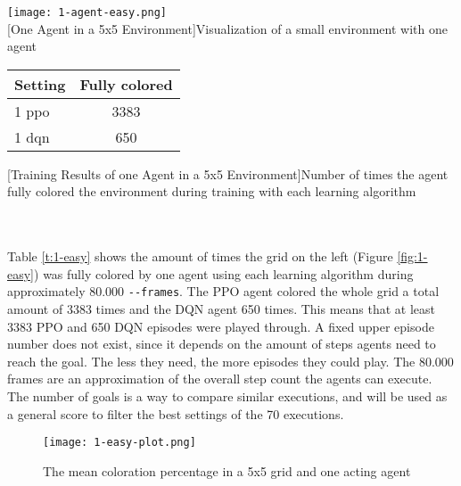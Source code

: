 \begin{minipage}{\textwidth}
  \begin{minipage}[b]{0.29\textwidth}
    \centering
    \texttt{[image: 1-agent-easy.png]}\\
    [One Agent in a 5x5 Environment]{Visualization of a small environment with one agent}\label{fig:1-easy}
  \end{minipage}
  \hfill
  \begin{minipage}[b]{0.69\textwidth}
    \centering
    \begin{tabular}{lc}\hline
      Setting & Fully colored \\ \hline
        1 ppo & 3383 \\
        1 dqn & 650 \\ \hline
      \end{tabular}
      [Training Results of one Agent in a 5x5 Environment]{Number of times the agent fully colored the environment during training with each learning algorithm \\}\label{t:1-easy}
    \end{minipage}
  \end{minipage}\\\\

Table \ref{t:1-easy} shows the amount of times the grid on the left (Figure \ref{fig:1-easy}) was fully colored by one agent using each learning algorithm during approximately 80.000 \verb|--frames|. The PPO agent colored the whole grid a total amount of 3383 times and the DQN agent 650 times. This means that at least 3383 PPO and 650 DQN episodes were played through. A fixed upper episode number does not exist, since it depends on the amount of steps agents need to reach the goal. The less they need, the more episodes they could play. The 80.000 frames are an approximation of the overall step count the agents can execute. The number of goals is a way to compare similar executions, and will be used as a general score to filter the best settings of the 70 executions.

\begin{figure}[hpbt]
    \centering
    \texttt{[image: 1-easy-plot.png]}\\
    \caption[Mean Coloration Percentage of one Agent in a 5x5 Environment]{The mean coloration percentage in a 5x5 grid and one acting agent}\label{fig:1-easy-plot}
\end{figure}

